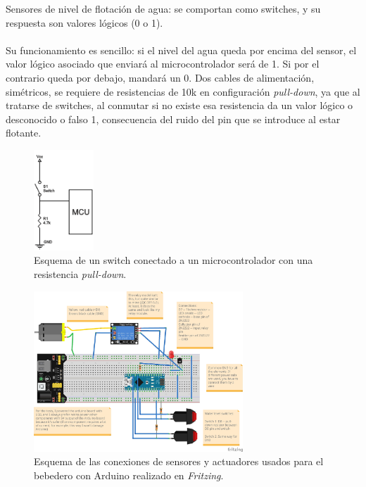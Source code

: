 \documentclass[12pt]{article}
\begin{document}
	\noindent Sensores de nivel de flotación de agua: se comportan como switches, y su respuesta son valores lógicos (0 o 1). \\
	
	  \\
	 
	 \noindent Su funcionamiento es sencillo: si el nivel del agua queda por encima del sensor, el valor lógico asociado que enviará al microcontrolador será de 1. Si por el contrario queda por debajo, mandará un 0. Dos cables de alimentación, simétricos, se requiere de resistencias de 10k en configuración \textit{pull-down}, ya que al tratarse de switches, al conmutar si no existe esa resistencia da un valor lógico o desconocido o falso 1, consecuencia del ruido del pin que se introduce al estar flotante.\\
	
	\begin{figure}[h]
		\begin{center}
			\includegraphics[width=0.2\textwidth]{img/pull-down-resistor.png}
			\caption{Esquema de un switch conectado a un microcontrolador con una resistencia \textit{pull-down}.}
			\label{Esquema resistencia pull-down}
		\end{center}
	\end{figure}
	
	
	\pagebreak
	
	\begin{figure}[h]
		\begin{center}
			\includegraphics[width=0.7\textwidth]{img/bebedero_test_fritzing.jpg}
			\caption{Esquema de las conexiones de sensores y actuadores usados para el bebedero con Arduino realizado en \textit{Fritzing}.}
			\label{Esquema conexiones bebedero Fritzing}
		\end{center}
	\end{figure}
\end{document}
